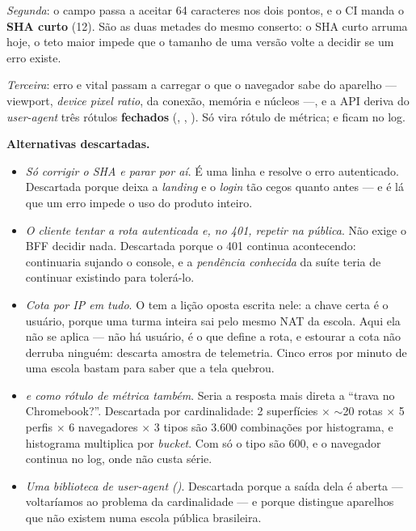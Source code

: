 \emph{Segunda}: o campo  passa a aceitar 64 caracteres nos dois
pontos, e o CI manda o \textbf{SHA curto} (12). São as duas metades do mesmo
conserto: o SHA curto arruma hoje, o teto maior impede que o tamanho de uma
versão volte a decidir se um erro existe.

\emph{Terceira}: erro e vital passam a carregar o que o navegador sabe do
aparelho --- viewport, \emph{device pixel ratio},  da conexão,
memória e núcleos ---, e a API deriva do \emph{user-agent} três rótulos
\textbf{fechados} (, , ). Só  vira rótulo
de métrica;  e  ficam no log.

\textbf{Alternativas descartadas.}
\begin{itemize}
  \item \emph{Só corrigir o SHA e parar por aí}. É uma linha e resolve o erro
    autenticado. Descartada porque deixa a \emph{landing} e o \emph{login} tão
    cegos quanto antes --- e é lá que um erro impede o uso do produto inteiro.
  \item \emph{O cliente tentar a rota autenticada e, no 401, repetir na
    pública}. Não exige o BFF decidir nada. Descartada porque o 401 continua
    acontecendo: continuaria sujando o console, e a \emph{pendência conhecida}
    da suíte teria de continuar existindo para tolerá-lo.
  \item \emph{Cota por IP em tudo}. O  tem a lição
    oposta escrita nele: a chave certa é o usuário, porque uma turma inteira sai
    pelo mesmo NAT da escola. Aqui ela não se aplica --- não há usuário, é o que
    define a rota, e estourar a cota não derruba ninguém: descarta amostra de
    telemetria. Cinco erros por minuto de uma escola bastam para saber que a tela
    quebrou.
  \item \emph{ e  como rótulo de métrica também}. Seria a
    resposta mais direta a \enquote{trava no Chromebook?}. Descartada por
    cardinalidade: 2 superfícies \(\times\) \(\sim\)20 rotas \(\times\) 5 perfis
    \(\times\) 6 navegadores \(\times\) 3 tipos são 3.600 combinações por
    histograma, e histograma multiplica por \emph{bucket}. Com só o tipo são
    600, e o navegador continua no log, onde não custa série.
  \item \emph{Uma biblioteca de \emph{user-agent} ()}.
    Descartada porque a saída dela é aberta --- voltaríamos ao problema da
    cardinalidade --- e porque distingue aparelhos que não existem numa escola
    pública brasileira.
\end{itemize}

